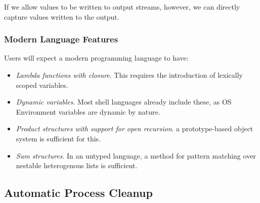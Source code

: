 \ifsigpro{ \documentclass[english,PRO]{ipsj} }
\begin{document}
If we allow values to be written to output streams, however, we can directly capture values written to the output.

\subsubsection{Modern Language Features}

Users will expect a modern programming language to have:

\begin{itemize}
  \item \emph{Lambda functions with closure}.
    This requires the introduction of lexically scoped variables.
  \item \emph{Dynamic variables}.
     Most shell languages already include these, as OS Environment variables are dynamic by nature.
  \item \emph{Product structures with support for open recursion}.
    a prototype-based object system is sufficient for this.
  \item \emph{Sum structures}. In an untyped language, a method for pattern matching over nestable heterogenous lists is sufficient.
\end{itemize}



\subsection{Automatic Process Cleanup}
\end{document}
